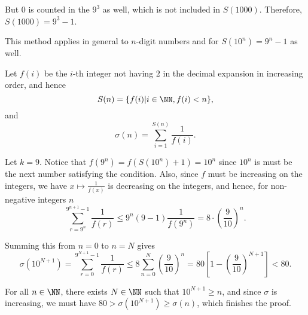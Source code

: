 \begin{enumerate}
          But \(0\) is counted in the \(9^3\) as well, which is not included in \(S(1000)\). Therefore, \(S(1000) = 9^3 - 1\).

          This method applies in general to \(n\)-digit numbers and for \(S(10^n) = 9^n - 1\) as well.

          Let \(f(i)\) be the \(i\)-th integer not having \(2\) in the decimal expansion in increasing order, and hence
          \[
              S(n) = \{f(i) | i \in \NN, f(i) < n\},
          \]
          and
          \[
              \sigma(n) = \sum_{i = 1}^{S(n)} \frac{1}{f(i)}.
          \]

          Let \(k = 9\). Notice that \(f(9^n) = f(S(10^n) + 1) = 10^n\) since \(10^n\) is must be the next number satisfying the condition. Also, since \(f\) must be increasing on the integers, we have \(x \mapsto \frac{1}{f(x)}\) is decreasing on the integers, and hence, for non-negative integers \(n\)
          \[
              \sum_{r = 9^n}^{9^{n + 1} - 1} \frac{1}{f(r)} \leq 9^n (9 - 1) \frac{1}{f(9^n)} = 8 \cdot \left(\frac{9}{10}\right)^n.
          \]

          Summing this from \(n = 0\) to \(n = N\) gives
          \[
              \sigma(10^{N + 1}) = \sum_{r = 0}^{9^{N + 1} - 1} \frac{1}{f(r)} \leq 8 \sum_{n = 0}^{N} \left(\frac{9}{10}\right)^n = 80 \left[1 - \left(\frac{9}{10}\right)^{N + 1} \right] < 80.
          \]

          For all \(n \in \NN\), there exists \(N \in \NN\) such that \(10^{N + 1} \geq n\), and since \(\sigma\) is increasing, we must have \(80 > \sigma(10^{N + 1}) \geq \sigma(n)\), which finishes the proof.

\end{enumerate}